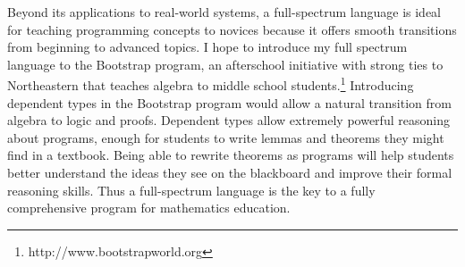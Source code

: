 \documentclass[12pt]{article}
\begin{document}
Beyond its applications to real-world systems, a full-spectrum language is ideal for teaching programming concepts to novices because it offers smooth transitions from beginning to advanced topics.
I hope to introduce my full spectrum language to the Bootstrap program, an afterschool initiative with strong ties to Northeastern that teaches algebra to middle school students.\footnote{http://www.bootstrapworld.org}
Introducing dependent types in the Bootstrap program would allow a natural transition from algebra to logic and proofs.
Dependent types allow extremely powerful reasoning about programs, enough for students to write lemmas and theorems they might find in a textbook.
Being able to rewrite theorems as programs will help students better understand the ideas they see on the blackboard and improve their formal reasoning skills.
Thus a full-spectrum language is the key to a fully comprehensive program for mathematics education.

\vfill{}
\renewcommand{\section}[2]{}
\begin{multicols}{2}
\footnotesize


\end{multicols}
\end{document}
